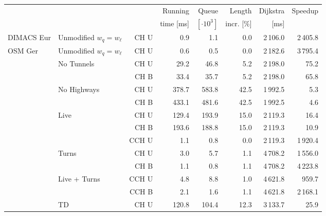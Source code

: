 \begin{tabular}{llrrrrrr}
\toprule & & &   Running &                Queue &     Length & Dijkstra & Speedup \\ & & & time [ms] & $[\cdot 10^3]$ & incr. [\%] &     [ms] &         \\
\midrule
DIMACS Eur & Unmodified $w_q = w_{\ell}$ & CH U &              0.9 &              1.1 &       0.0 &                    2\,106.0 &   2\,405.8 \\ \addlinespace
OSM Ger & Unmodified $w_q = w_{\ell}$ & CH U &              0.6 &              0.5 &       0.0 &                    2\,182.6 &   3\,795.4 \\[2pt]
        & No Tunnels & CH U &             29.2 &             46.8 &       5.2 &                    2\,198.0 &     75.2 \\
        &    & CH B &             33.4 &             35.7 &       5.2 &                    2\,198.0 &     65.8 \\[2pt]
        & No Highways & CH U &            378.7 &            583.8 &      42.5 &                    1\,992.5 &      5.3 \\
        &    & CH B &            433.1 &            481.6 &      42.5 &                    1\,992.5 &      4.6 \\[2pt]
        & Live & CH U &            129.4 &            193.9 &      15.0 &                    2\,119.3 &     16.4 \\
        &    & CH B &            193.6 &            188.8 &      15.0 &                    2\,119.3 &     10.9 \\
        &    & CCH U &              1.1 &              0.8 &       0.0 &                    2\,119.3 &   1\,920.4 \\[2pt]
        & Turns & CH U &              3.0 &              5.7 &       1.1 &                    4\,708.2 &   1\,556.0 \\
        &    & CH B &              1.1 &              0.8 &       1.1 &                    4\,708.2 &   4\,223.8 \\[2pt]
        & Live + Turns & CCH U &              4.8 &              8.8 &       1.0 &                    4\,621.8 &    959.7 \\
        &    & CCH B &              2.1 &              1.6 &       1.1 &                    4\,621.8 &   2\,168.1 \\[2pt]
        & TD & CH U &            120.8 &            104.4 &      12.3 &                    3\,133.7 &     25.9 \\

\end{tabular}
